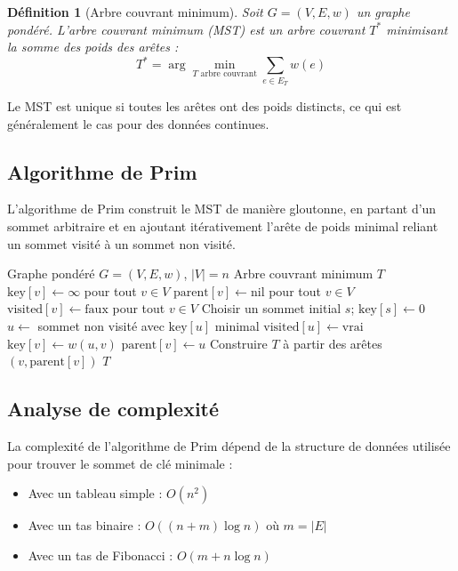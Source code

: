 \documentclass[11pt,a4paper]{article}
\newtheorem{definition}{Définition}[section]
\begin{document}
\begin{definition}[Arbre couvrant minimum]
Soit $G = (V, E, w)$ un graphe pondéré. L'\textit{arbre couvrant minimum} (MST) est un arbre couvrant $T^*$ minimisant la somme des poids des arêtes :
\begin{equation}
T^* = \arg\min_{T \text{ arbre couvrant}} \sum_{e \in E_T} w(e)
\end{equation}
\end{definition}

Le MST est unique si toutes les arêtes ont des poids distincts, ce qui est généralement le cas pour des données continues.

\subsection{Algorithme de Prim}

L'algorithme de Prim construit le MST de manière gloutonne, en partant d'un sommet arbitraire et en ajoutant itérativement l'arête de poids minimal reliant un sommet visité à un sommet non visité.

\begin{algorithm}[htbp]
\caption{Algorithme de Prim pour le MST}
\begin{algorithmic}[1]
\REQUIRE Graphe pondéré $G = (V, E, w)$, $|V| = n$
\ENSURE Arbre couvrant minimum $T$
\STATE $\text{key}[v] \leftarrow \infty$ pour tout $v \in V$
\STATE $\text{parent}[v] \leftarrow \text{nil}$ pour tout $v \in V$
\STATE $\text{visited}[v] \leftarrow \text{faux}$ pour tout $v \in V$
\STATE Choisir un sommet initial $s$; $\text{key}[s] \leftarrow 0$
    \STATE $u \leftarrow$ sommet non visité avec $\text{key}[u]$ minimal
    \STATE $\text{visited}[u] \leftarrow \text{vrai}$
            \STATE $\text{key}[v] \leftarrow w(u,v)$
            \STATE $\text{parent}[v] \leftarrow u$
        \ENDIF
    \ENDFOR
\ENDFOR
\STATE Construire $T$ à partir des arêtes $(v, \text{parent}[v])$
\RETURN $T$
\end{algorithmic}
\end{algorithm}

\subsection{Analyse de complexité}

La complexité de l'algorithme de Prim dépend de la structure de données utilisée pour trouver le sommet de clé minimale :
\begin{itemize}
    \item Avec un tableau simple : $O(n^2)$
    \item Avec un tas binaire : $O((n + m) \log n)$ où $m = |E|$
    \item Avec un tas de Fibonacci : $O(m + n \log n)$
\end{itemize}
\end{document}
